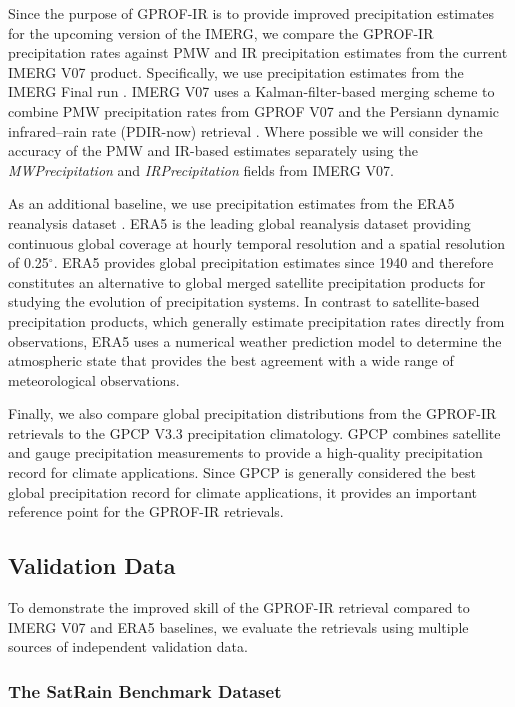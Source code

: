 \documentclass{ametsocV6.1}
\begin{document}
Since the purpose of GPROF-IR is to provide improved precipitation estimates for
the upcoming version of the IMERG, we compare the GPROF-IR precipitation rates
against PMW and IR precipitation estimates from the current IMERG V07 product.
Specifically, we use precipitation estimates from the IMERG Final run
\citep{gpm_imerg_final_v07}. IMERG V07 uses a Kalman-filter-based merging scheme
\citep{huffman2019imerg_v07_atbd} to combine PMW precipitation rates from GPROF
V07 and the Persiann dynamic infrared--rain rate (PDIR-now) retrieval
\citep{nguyen2020persiann}. Where possible we will consider the accuracy of the
PMW and IR-based estimates separately using the \textit{MWPrecipitation} and
\textit{IRPrecipitation} fields from IMERG V07.

As an additional baseline, we use precipitation estimates from the ERA5
reanalysis dataset \citep{hersbach_era5_2020}. ERA5 is the leading global
reanalysis dataset providing continuous global coverage at hourly temporal
resolution and a spatial resolution of 0.25$^\circ$. ERA5 provides global
precipitation estimates since 1940 and therefore constitutes an alternative to
global merged satellite precipitation products for studying the evolution of precipitation
systems. In contrast to satellite-based precipitation products, which generally
estimate precipitation rates directly from observations, ERA5 uses a numerical
weather prediction model to determine the atmospheric state that provides the
best agreement with a wide range of meteorological observations.

Finally, we also compare global precipitation distributions from the GPROF-IR
retrievals to the GPCP V3.3 \citep{gpcp_v33_precip} precipitation climatology.
GPCP combines satellite and gauge precipitation measurements to provide a
high-quality precipitation record for climate applications. Since GPCP is
generally considered the best global precipitation record for climate
applications, it provides an important reference point for the GPROF-IR
retrievals.

\subsection{Validation Data}

To demonstrate the improved skill of the GPROF-IR retrieval compared to IMERG
V07 and ERA5 baselines, we evaluate the retrievals using multiple sources of
independent validation data.

\subsubsection{The SatRain Benchmark Dataset}
\end{document}

